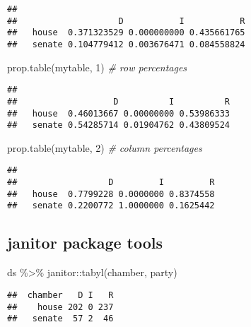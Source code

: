 \documentclass[
]{book}
\newenvironment{Shaded}{\begin{snugshade}}{\end{snugshade}}
\newcommand{\CommentTok}[1]{\textcolor[rgb]{0.56,0.35,0.01}{\textit{#1}}}
\newcommand{\DecValTok}[1]{\textcolor[rgb]{0.00,0.00,0.81}{#1}}
\newcommand{\FunctionTok}[1]{\textcolor[rgb]{0.00,0.00,0.00}{#1}}
\newcommand{\NormalTok}[1]{#1}
\newcommand{\SpecialCharTok}[1]{\textcolor[rgb]{0.00,0.00,0.00}{#1}}
\begin{document}
\begin{verbatim}
##         
##                    D           I           R
##   house  0.371323529 0.000000000 0.435661765
##   senate 0.104779412 0.003676471 0.084558824
\end{verbatim}

\begin{Shaded}
\begin{Highlighting}[]
\FunctionTok{prop.table}\NormalTok{(mytable, }\DecValTok{1}\NormalTok{) }\CommentTok{\# row percentages}
\end{Highlighting}
\end{Shaded}

\begin{verbatim}
##         
##                   D          I          R
##   house  0.46013667 0.00000000 0.53986333
##   senate 0.54285714 0.01904762 0.43809524
\end{verbatim}

\begin{Shaded}
\begin{Highlighting}[]
\FunctionTok{prop.table}\NormalTok{(mytable, }\DecValTok{2}\NormalTok{) }\CommentTok{\# column percentages}
\end{Highlighting}
\end{Shaded}

\begin{verbatim}
##         
##                  D         I         R
##   house  0.7799228 0.0000000 0.8374558
##   senate 0.2200772 1.0000000 0.1625442
\end{verbatim}

\hypertarget{janitor-package-tools}{%
\subsection{janitor package tools}\label{janitor-package-tools}}

\begin{Shaded}
\begin{Highlighting}[]
\NormalTok{ds }\SpecialCharTok{\%\textgreater{}\%}\NormalTok{  janitor}\SpecialCharTok{::}\FunctionTok{tabyl}\NormalTok{(chamber, party)}
\end{Highlighting}
\end{Shaded}

\begin{verbatim}
##  chamber   D I   R
##    house 202 0 237
##   senate  57 2  46
\end{verbatim}
\end{document}
